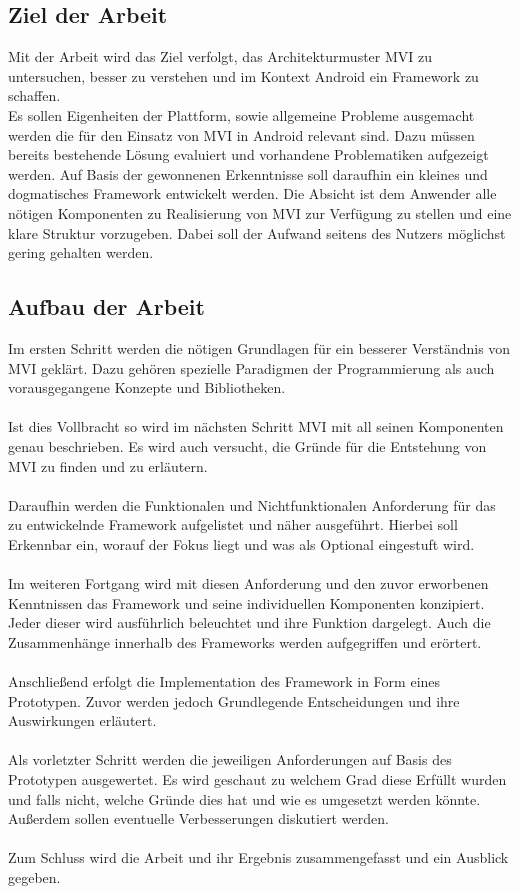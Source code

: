 \subsection{Ziel der Arbeit}
\label{subsec:ziel-der-arbeit}
Mit der Arbeit wird das Ziel verfolgt, das Architekturmuster MVI zu untersuchen, besser zu verstehen und im Kontext Android ein Framework zu schaffen.
\\
Es sollen Eigenheiten der Plattform, sowie allgemeine Probleme ausgemacht werden die für den Einsatz von MVI in Android relevant sind. Dazu müssen bereits bestehende Lösung evaluiert und vorhandene Problematiken aufgezeigt werden. Auf Basis der gewonnenen Erkenntnisse soll daraufhin ein kleines und dogmatisches Framework entwickelt werden. Die Absicht ist dem Anwender alle nötigen Komponenten zu Realisierung von MVI zur Verfügung zu stellen und eine klare Struktur vorzugeben. Dabei soll der Aufwand seitens des Nutzers möglichst gering gehalten werden.

\subsection{Aufbau der Arbeit}
\label{subsec:aufbau-der-arbeit}
Im ersten Schritt werden die nötigen Grundlagen für ein besserer Verständnis von MVI geklärt. Dazu gehören spezielle Paradigmen der Programmierung als auch vorausgegangene Konzepte und Bibliotheken.
\\\\
Ist dies Vollbracht so wird im nächsten Schritt MVI mit all seinen Komponenten genau beschrieben. Es wird auch versucht, die Gründe für die Entstehung von MVI zu finden und zu erläutern.
\\\\
Daraufhin werden die Funktionalen und Nichtfunktionalen Anforderung für das zu entwickelnde Framework aufgelistet und näher ausgeführt. Hierbei soll Erkennbar ein, worauf der Fokus liegt und was als Optional eingestuft wird. 
\\\\
Im weiteren Fortgang wird mit diesen Anforderung und den zuvor erworbenen Kenntnissen das Framework und seine individuellen Komponenten konzipiert. Jeder dieser wird ausführlich beleuchtet und ihre Funktion dargelegt. Auch die Zusammenhänge innerhalb des Frameworks werden aufgegriffen und erörtert.
\\\\
Anschließend erfolgt die Implementation des Framework in Form eines Prototypen. Zuvor werden jedoch Grundlegende Entscheidungen und ihre Auswirkungen erläutert. 
\\\\
Als vorletzter Schritt werden die jeweiligen Anforderungen auf Basis des Prototypen ausgewertet. Es wird geschaut zu welchem Grad diese Erfüllt wurden und falls nicht, welche Gründe dies hat und wie es umgesetzt werden könnte. Außerdem sollen eventuelle Verbesserungen diskutiert werden.
\\\\
Zum Schluss wird die Arbeit und ihr Ergebnis zusammengefasst und ein Ausblick gegeben.